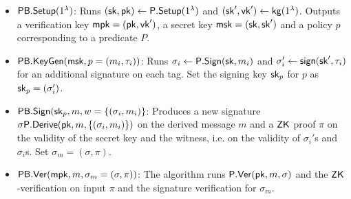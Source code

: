 \documentclass[11pt]{llncs}
\begin{document}
\begin{itemize}


\item ${\sf PB.Setup}(1^\lambda)$: Runs $({\sf sk}, {\sf pk}) \gets {\sf P.Setup}(1^\lambda)$ and $({\sf sk}', {\sf vk}') \gets {\sf kg}(1^{\lambda})$.  Outputs a verification key ${\sf mpk}=({\sf pk}, {\sf vk}')$, a secret key ${\sf msk}=({\sf sk}, {\sf sk}')$ and a policy $p$ 
corresponding to a predicate $P$.


\item ${\sf PB.KeyGen}({\sf msk}, p=(m_i, \tau_i))$: Runs $\sigma_i \gets {\sf P.Sign}({\sf sk}, m_i)$ and $\sigma'_i \gets {\sf sign}({\sf sk}', \tau_i)$ for an additional signature on each tag. Set the signing key ${\sf sk}_p$ for $p$ as ${\sf sk}_p=(\sigma'_i)$.

\item ${\sf PB.Sign}({\sf sk}_p, m, w= \lbrace (\sigma_i, m_i) \rbrace$: Produces a new signature $\sigma {\sf P.Derive}({\sf pk}, m, \lbrace (\sigma_i, m_i) \rbrace)$ on the derived message $m$ and a ${\sf ZK}$ proof $\pi$ on the validity of the secret key and the witness, i.e. on the validity of $\sigma_i'$s and $\sigma_i$s. Set $\sigma_m=(\sigma, \pi)$.


\item ${\sf PB.Ver}({\sf mpk},  m, \sigma_m = (\sigma, \pi))$: The algorithm runs ${\sf P.Ver}({\sf pk}, m, \sigma)$ and the ${\sf ZK}$-verification on input $\pi$ and the signature verification for $\sigma_m$.


\end{itemize}

 

%
%
\end{document}
